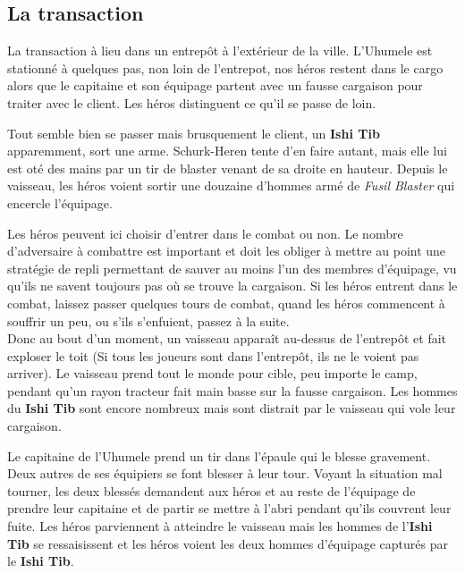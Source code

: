 \subsection{La transaction}

La transaction à lieu dans un entrepôt à l’extérieur de la ville. L’Uhumele est stationné à quelques pas, non loin de l’entrepot, nos héros restent dans le cargo alors que le capitaine et son équipage partent avec un fausse cargaison pour traiter avec le client. Les héros distinguent ce qu’il se passe de loin.

Tout semble bien se passer mais brusquement le client, un \textbf{Ishi Tib} apparemment, sort une arme. Schurk-Heren tente d’en faire autant, mais elle lui est oté des mains par un tir de blaster venant de sa droite en hauteur. Depuis le vaisseau, les héros voient sortir une douzaine d’hommes armé de \textit{Fusil Blaster} qui encercle l’équipage.

Les héros peuvent ici choisir d’entrer dans le combat ou non. Le nombre d’adversaire à combattre est important et doit les obliger à mettre au point une stratégie de repli permettant de sauver au moins l’un des membres d’équipage, vu qu’ils ne savent toujours pas où se trouve la cargaison. Si les héros entrent dans le combat, laissez passer quelques tours de combat, quand les héros commencent à souffrir un peu, ou s’ils s’enfuient, passez à la suite.\\

Donc au bout d’un moment, un vaisseau apparaît au-dessus de l’entrepôt et fait exploser le toit (Si tous les joueurs sont dans l’entrepôt, ils ne le voient pas arriver). Le vaisseau prend tout le monde pour cible, peu importe le camp, pendant qu’un rayon tracteur fait main basse sur la fausse cargaison.
Les hommes du \textbf{Ishi Tib} sont encore nombreux mais sont distrait par le vaisseau qui vole leur cargaison.

Le capitaine de l’Uhumele prend un tir dans l’épaule qui le blesse gravement. Deux autres de ses équipiers se font blesser à leur tour. Voyant la situation mal tourner, les deux blessés demandent aux héros et au reste de l’équipage de prendre leur capitaine et de partir se mettre à l’abri pendant qu’ils couvrent leur fuite. Les héros parviennent à atteindre le vaisseau mais les hommes de l’\textbf{Ishi Tib} se ressaisissent et les héros voient les deux hommes d’équipage capturés par le \textbf{Ishi Tib}.

